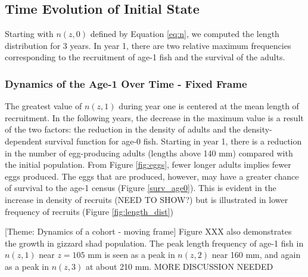 \documentclass[preprint,review,12pt,authoryear]{elsarticle}
\begin{document}
\subsection{Time Evolution of Initial State}
Starting with $n(z,0)$ defined by Equation \ref{eq:n}, we computed the length distribution for 3 years.  
In year 1, there are two relative maximum frequencies corresponding to the recruitment of age-1 fish and the survival of the adults.

\subsubsection{Dynamics of the Age-1 Over Time - Fixed Frame}
 The greatest value of $n(z,1)$ during year one is centered at the mean length of recruitment. 
 In the following years, the decrease in the maximum value is a result of the two factors:  the reduction in the density of adults and the density-dependent survival function for age-0 fish. 
 Starting in year 1, there is a reduction in the number of egg-producing adults (lengths above 140 mm) compared with the initial population.  
 From Figure \ref{fig:eggs}, fewer longer adults implies fewer eggs produced.  
 The eggs that are produced, however, may have a greater chance of survival to the age-1 census (Figure \ref{surv_age0}).  
 This is evident in the increase in density of recruits (NEED TO SHOW?) but is illustrated in lower frequency of recruits (Figure \ref{fig:length_dist}) 




[Theme: Dynamics of a cohort - moving frame]
Figure XXX also demonstrates the growth in gizzard shad population.  
The peak length frequency of age-1 fish in $n(z,1)$ near $z = 105$ mm is seen as a peak in $n(z,2)$ near 160 mm, and again as a peak in $n(z,3)$ at about 210 mm. 
 MORE DISCUSSION NEEDED
\end{document}
